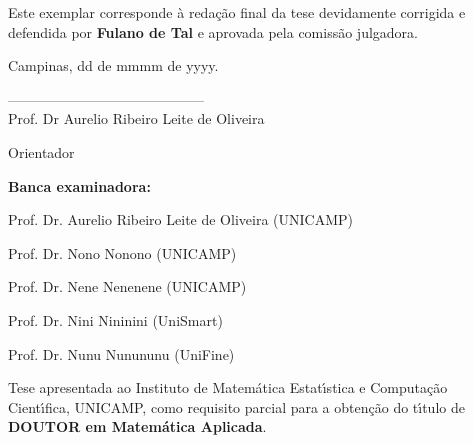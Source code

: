\begin{titlepage}
\thispagestyle{plain}
\begin{center}
\end{center}

\vspace{.5cm}
\hfill
\begin{minipage}{7cm}\sf
Este exemplar corresponde \`a reda\c{c}\~ao final da tese devidamente corrigida
e defendida por {\bfseries Fulano de Tal} e aprovada pela comissão
julgadora.\\
\begin{center}\sf
Campinas, dd de mmmm de yyyy.\\

\vspace*{0.5cm} 

------------------------------------------ \\
Prof. Dr Aurelio Ribeiro Leite de Oliveira

Orientador

\vspace*{.5cm}

\end{center}
\end{minipage}

\vspace*{1cm}
{\sffamily
\textbf{Banca examinadora:}

Prof. Dr.  Aurelio Ribeiro Leite de Oliveira (UNICAMP) \vspace*{1mm}

Prof. Dr. Nono Nonono (UNICAMP)\vspace*{1mm}

Prof. Dr. Nene Nenenene (UNICAMP)\vspace*{1mm}

Prof. Dr. Nini Nininini (UniSmart)\vspace*{1mm}

Prof. Dr. Nunu Nunununu (UniFine)}
\vspace*{2cm}




\hfill
\begin{minipage}{6.5cm}
{ \sf Tese apresentada ao Instituto de Matem\'atica Estat\'{\i}stica
e Computa\c{c}\~ao Cient\'{\i}fica, UNICAMP, como requisito parcial para
a obten\c{c}\~ao do t\'{\i}tulo de {\bfseries DOUTOR em Matem\'atica Aplicada}.}
\end{minipage}


\end{titlepage}
